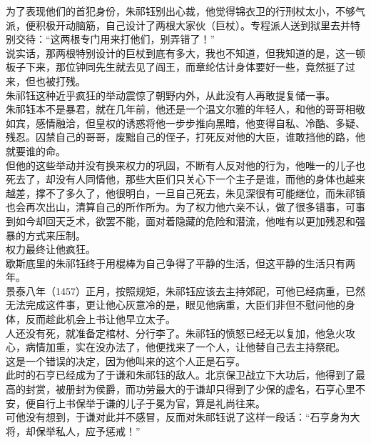 \begin{multicols}{\theparacolNo}
为了表现他们的首犯身份，朱祁钰别出心裁，他觉得锦衣卫的行刑杖太小，不够气派，便积极开动脑筋，自己设计了两根大家伙（巨杖）。专程派人送到狱里去并特别交待：“这两根专门用来打他们，别弄错了！”\\

说实话，那两根特别设计的巨杖到底有多大，我也不知道，但我知道的是，这一顿板子下来，那位钟同先生就去见了阎王，而章纶估计身体要好一些，竟然挺了过来，但也被打残。\\

朱祁钰这种近乎疯狂的举动震惊了朝野内外，从此没有人再敢提复储一事。\\

朱祁钰本不是暴君，就在几年前，他还是一个温文尔雅的年轻人，和他的哥哥相敬如宾，感情融洽，但皇权的诱惑将他一步步推向黑暗，他变得自私、冷酷、多疑、残忍。囚禁自己的哥哥，废黜自己的侄子，打死反对他的大臣，谁敢挡他的路，他就要谁的命。\\

但他的这些举动并没有换来权力的巩固，不断有人反对他的行为，他唯一的儿子也死去了，却没有人同情他，那些大臣们只关心下一个主子是谁，而他的身体也越来越差，撑不了多久了，他很明白，一旦自己死去，朱见深很有可能继位，而朱祁镇也会再次出山，清算自己的所作所为。为了权力他六亲不认，做了很多错事，可事到如今却回天乏术，欲罢不能，面对着隐藏的危险和潜流，他唯有以更加残忍和强暴的方式来压制。\\

权力最终让他疯狂。\\

歇斯底里的朱祁钰终于用棍棒为自己争得了平静的生活，但这平静的生活只有两年。\\

景泰八年（1457）正月，按照规矩，朱祁钰应该去主持郊祀，可他已经病重，已然无法完成这件事，更让他心灰意冷的是，眼见他病重，大臣们非但不慰问他的身体，反而趁此机会上书让他早立太子。\\

人还没有死，就准备定棺材、分行李了。朱祁钰的愤怒已经无以复加，他急火攻心，病情加重，实在没办法了，他便找来了一个人，让他替自己去主持祭祀。\\

这是一个错误的决定，因为他叫来的这个人正是石亨。\\

此时的石亨已经成为了于谦和朱祁钰的敌人。北京保卫战立下大功后，他得到了最高的封赏，被册封为侯爵，而功劳最大的于谦却只得到了少保的虚名，石亨心里不安，便自行上书保举于谦的儿子于冕为官，算是礼尚往来。\\

可他没有想到，于谦对此并不感冒，反而对朱祁钰说了这样一段话：“石亨身为大将，却保举私人，应予惩戒！”\\


\end{multicols}
